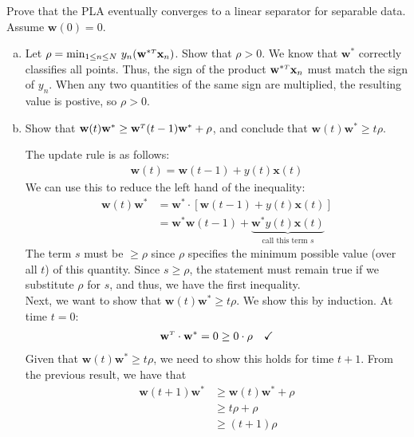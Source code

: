 \documentclass[10pt]{article}
\newcommand{\BF}[1]{\mathbf{#1}}
\newcommand{\RM}[1]{\mathrm{#1}}
\newcommand{\T}{{\mathsmaller T}}
\newenvironment{problem}[2][Problem]{\begin{trivlist}
\item[\hskip \labelsep {\bfseries #1}\hskip \labelsep {\bfseries #2.}]}{\end{trivlist}}
\begin{document}
\begin{problem}{1.3} Prove that the PLA eventually converges to a linear
  separator for separable data. Assume $\BF{w}(0) = 0$.

  \begin{enumerate}[a)]
  \item Let $\rho = \RM{min}_{1 \leq n \leq N}~y_n(\BF{w}^{*\T} \BF{x}_n)$. Show that $\rho > 0$.
    We know that $\BF{w}^*$ correctly classifies all points. Thus, the
    sign of the product $\BF{w}^{*\T} \BF{x}_n$ must match the sign of $y_n$.
    When any two quantities of the same sign are multiplied, the resulting
    value is postive, so $\rho > 0$.

  \item Show that $\BF{w}(t)\BF{w}^* \geq \BF{w}^\T (t - 1)\BF{w}^* + \rho$, and conclude that
    $\BF{w}(t)\BF{w}^* \geq t\rho$.

    The update rule is as follows:
    \begin{align*}
      \BF{w}(t) = \BF{w}(t - 1) + y(t)\BF{x}(t)
    \end{align*}
    We can use this to reduce the left hand of the inequality:
    \begin{align*}
      \BF{w}(t)\BF{w}^*
      &= \BF{w}^* \cdot [\BF{w}(t-1) + y(t)\BF{x}(t)] \\
      &= \BF{w}^* \BF{w}(t-1) + \underbrace{\BF{w}^*y(t)\BF{x}(t)}_{\text{call this term $s$}}
    \end{align*}
    The term $s$ must be $\geq \rho$ since $\rho$ specifies the
    minimum possible value (over all $t$) of this quantity. Since
    $s \geq \rho$, the statement must remain true if we substitute
    $\rho$ for $s$,
    and thus, we have the first inequality. \\

    Next, we want to show that $\BF{w}(t)\BF{w}^* \geq t\rho$. We show
    this by induction. At time $t =0$:
    \begin{align*}
      \BF{w}^\T \cdot \BF{w}^* = 0 \geq 0
      \cdot \rho~~~\checkmark
    \end{align*}
    Given that $\BF{w}(t)\BF{w}^* \geq t\rho$, we need to show this holds for time $t + 1$. From
    the previous result, we have that
    \begin{align*}
      \BF{w}(t + 1)\BF{w}^*
      &\geq \BF{w}(t)\BF{w}^* + \rho\\
      &\geq t\rho + \rho \\
      &\geq (t+1)\rho
    \end{align*}


\end{enumerate}
\end{problem}
\end{document}
